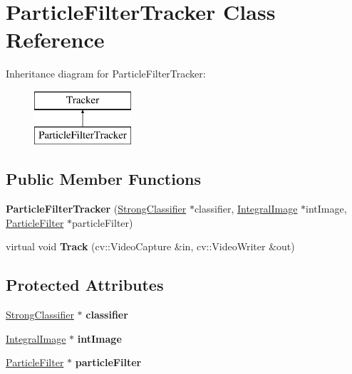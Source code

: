 \hypertarget{classParticleFilterTracker}{}\section{Particle\+Filter\+Tracker Class Reference}
\label{classParticleFilterTracker}
Inheritance diagram for Particle\+Filter\+Tracker\+:\begin{figure}[H]
\begin{center}
\leavevmode
\includegraphics[height=2.000000cm]{classParticleFilterTracker}
\end{center}
\end{figure}
\subsection*{Public Member Functions}
\begin{DoxyCompactItemize}
\item 
\hypertarget{classParticleFilterTracker_ad210c144a99e19d077b4752f78998886}{}{\bfseries Particle\+Filter\+Tracker} (\hyperlink{classStrongClassifier}{Strong\+Classifier} $\ast$classifier, \hyperlink{classIntegralImage}{Integral\+Image} $\ast$int\+Image, \hyperlink{classParticleFilter}{Particle\+Filter} $\ast$particle\+Filter)\label{classParticleFilterTracker_ad210c144a99e19d077b4752f78998886}

\item 
\hypertarget{classParticleFilterTracker_ad19ecb5024b65756896dc53293ea4d56}{}virtual void {\bfseries Track} (cv\+::\+Video\+Capture \&in, cv\+::\+Video\+Writer \&out)\label{classParticleFilterTracker_ad19ecb5024b65756896dc53293ea4d56}

\end{DoxyCompactItemize}
\subsection*{Protected Attributes}
\begin{DoxyCompactItemize}
\item 
\hypertarget{classParticleFilterTracker_ad585da715e3f1711ea1c554ffd94e389}{}\hyperlink{classStrongClassifier}{Strong\+Classifier} $\ast$ {\bfseries classifier}\label{classParticleFilterTracker_ad585da715e3f1711ea1c554ffd94e389}

\item 
\hypertarget{classParticleFilterTracker_abd3719107a5a7594cd90eded262ff246}{}\hyperlink{classIntegralImage}{Integral\+Image} $\ast$ {\bfseries int\+Image}\label{classParticleFilterTracker_abd3719107a5a7594cd90eded262ff246}

\item 
\hypertarget{classParticleFilterTracker_aad6d152590d59bbd7cbd0515a14b3954}{}\hyperlink{classParticleFilter}{Particle\+Filter} $\ast$ {\bfseries particle\+Filter}\label{classParticleFilterTracker_aad6d152590d59bbd7cbd0515a14b3954}

\end{DoxyCompactItemize}


